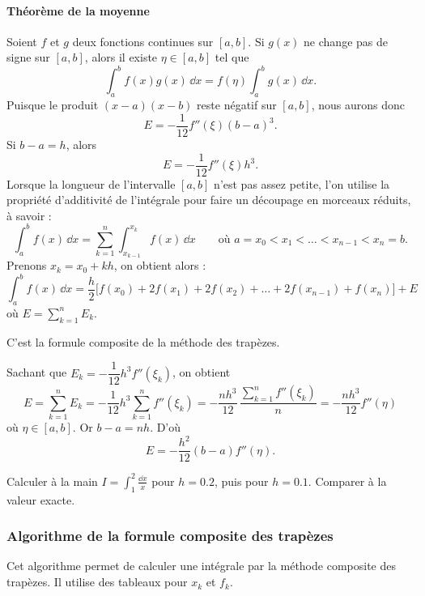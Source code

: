 \paragraph{Théorème de la moyenne} Soient $f$ et $g$ deux fonctions
continues sur $[a,b]$. Si $g(x)$ ne change pas de signe sur $[a,b]$, alors il
existe $\eta \in [a,b]$ tel que
\[
  \int_a^b f(x)g(x)\,\dd x = f(\eta)\int_a^b g(x)\,\dd x .
\]
Puisque le produit $(x - a)(x - b)$ reste négatif sur $[a,b]$, nous aurons
donc
\[
  E = -\frac{1}{12}f''(\xi)(b - a)^3 .
\]
Si $b - a = h$, alors
\[
  E = -\frac{1}{12}f''(\xi)h^3 .
\]
Lorsque la longueur de l'intervalle $[a,b]$ n'est pas assez petite, l'on
utilise la propriété d'additivité de l'intégrale pour faire un découpage en
morceaux réduits, à savoir :
\[
  \int_a^b f(x)\,\dd x = \sum_{k=1}^{n}\int_{x_{k-1}}^{x_k} f(x)\,\dd x
  \qquad\text{où } a = x_0 < x_1 < \dots < x_{n-1} < x_n = b .
\]
Prenons $x_k = x_0 + kh$, on obtient alors :
\[
  \int_a^b f(x)\,\dd x = \frac{h}{2}\bigl[f(x_0) + 2f(x_1) + 2f(x_2) + \dots
                         + 2f(x_{n-1}) + f(x_n)\bigr] + E
\]
où $E = \sum_{k=1}^{n} E_k$.

C'est la formule composite de la méthode des trapèzes.

Sachant que $E_k = -\dfrac{1}{12}h^3f''(\xi_k)$, on obtient
\[
  E = \sum_{k=1}^{n} E_k = -\frac{1}{12}h^3\sum_{k=1}^{n} f''(\xi_k)
    = -\frac{nh^3}{12}\,\frac{\sum_{k=1}^{n} f''(\xi_k)}{n}
    = -\frac{nh^3}{12}f''(\eta)
\]
où $\eta \in [a,b]$. Or $b - a = nh$. D'où
\[
  E = -\frac{h^2}{12}(b - a)f''(\eta) .
\]

\begin{exercice}[Exercice 3]
Calculer à la main $I = \displaystyle\int_1^2 \frac{\dd x}{x}$ pour $h = 0.2$,
puis pour $h = 0.1$. Comparer à la valeur exacte.
\end{exercice}

\subsubsection{Algorithme de la formule composite des trapèzes}

Cet algorithme permet de calculer une intégrale par la méthode composite des
trapèzes. Il utilise des tableaux pour $x_k$ et $f_k$.

